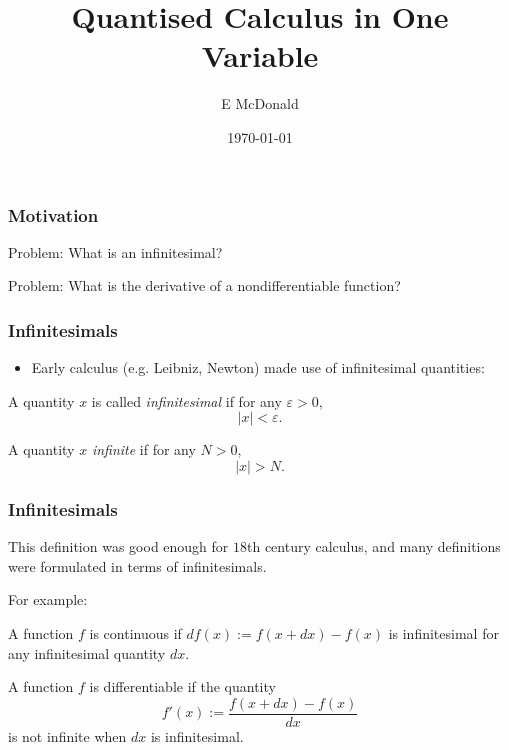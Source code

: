 \documentclass{beamer}
\title[Quantised Calculus]{Quantised Calculus in One Variable}
\author{E McDonald}
\institute[UNSW] { UNSW Australia }
\date{\today}
\begin{document}
 


\begin{frame} 
\titlepage 
\end{frame} %



\begin{frame} 

\frametitle{Motivation} 

\begin{block}
{Problem:}
What is an infinitesimal?
\end{block}
\begin{block} 
{Problem:}
What is the derivative of a nondifferentiable function?
\end{block}

\end{frame} 

\begin{frame} 
\frametitle{Infinitesimals} 
\begin{itemize}
    \item{} Early calculus (e.g. Leibniz, Newton) made use of infinitesimal quantities:
\end{itemize}
\begin{definition}
    A quantity $x$ is called \emph{infinitesimal} if for any $\varepsilon > 0$,
    \begin{equation*}
        |x| < \varepsilon.
    \end{equation*}
\end{definition}
\begin{definition}
    A quantity $x$ \emph{infinite} if for any $N > 0$, 
    \begin{equation*}
        |x| > N.
    \end{equation*}
\end{definition}
\end{frame} 

\begin{frame} 
\frametitle{Infinitesimals}
This definition was good enough for $18$th century calculus, and many
definitions were formulated in terms of infinitesimals.

For example:
\begin{definition}
    A function $f$ is continuous if $df(x) := f(x+dx)-f(x)$ is infinitesimal
    for any infinitesimal quantity $dx$.
\end{definition}
\begin{definition}
    A function $f$ is differentiable if the quantity
    \begin{equation*}
        f'(x) := \frac{f(x+dx)-f(x)}{dx}
    \end{equation*}
    is not infinite when $dx$ is infinitesimal.
\end{definition}
\end{frame}
\end{document}
